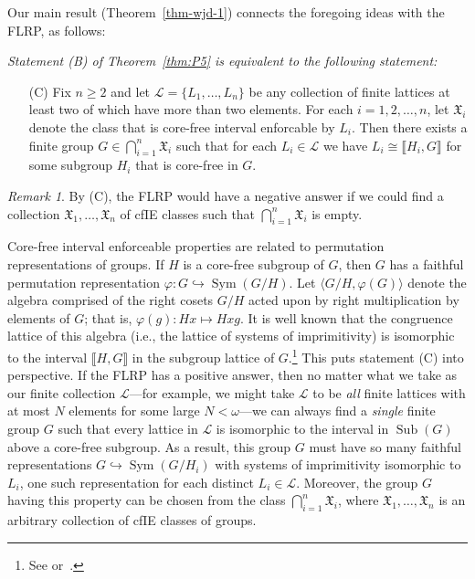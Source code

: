 \documentclass{gen-j-l}
\newcommand{\lb}{\ensuremath{\llbracket}}
\newcommand{\rb}{\ensuremath{\rrbracket}}
\newcommand{\<}{\ensuremath{\langle}}
\renewcommand{\>}{\ensuremath{\rangle}}
\theoremstyle{plain}
\theoremstyle{definition}
\theoremstyle{remark}
\newtheorem*{remark}{Remark}
\numberwithin{theorem}{section}
\numberwithin{claim}{section}
\numberwithin{equation}{section}
\numberwithin{conjecture}{section}
\renewcommand{\leq}{\ensuremath{\leqslant}}
\renewcommand{\geq}{\ensuremath{\geqslant}}
\newcommand{\Con}{\ensuremath{\operatorname{Con}}}
\newcommand{\Sub}{\ensuremath{\operatorname{Sub}}}
\newcommand{\Sym}{\ensuremath{\operatorname{Sym}}}
\newcommand{\2}{\ensuremath{\mathbf{2}}}
\newcommand{\3}{\ensuremath{\mathbf{3}}}
\newcommand{\sG}{\ensuremath{\mathfrak{X}}}
\newcommand{\sL}{\ensuremath{\mathscr{L}}}
\renewcommand{\phi}{\ensuremath{\varphi}}
\begin{document}
Our main result (Theorem~\ref{thm-wjd-1}) connects the
foregoing ideas with the \acs{FLRP}, as follows:\\[6pt]
{\it 
Statement (B) of Theorem~\ref{thm:P5} is equivalent to the following statement:

\begin{enumerate}
\item[(C)]
Fix $n\geq 2$ and let $\sL = \{L_1, \dots, L_n\}$ be any collection of
finite lattices at least two of which have more than two elements.
For each $i = 1, 2, \dots, n$, let $\sG_i$ denote the class that is
core-free interval enforcable by $L_i$. Then there exists a finite group $G \in
\bigcap\limits_{i=1}^n \sG_i$ such that for 
each $L_i \in \sL$ we have $L_i\cong \lb H_i, G \rb$ for some subgroup
$H_i$ that is core-free in $G$. %
\end{enumerate}

\begin{remark}
By (C), the \acs{FLRP} would have a negative answer if we
could find a collection $\sG_1, \dots, \sG_n$ of \acs{cfIE} classes
such that $\bigcap\limits_{i=1}^n \sG_i$ is empty.
\end{remark}
}

Core-free interval enforceable properties are related to
permutation representations of groups.
If $H$ is a core-free subgroup of $G$, then $G$ has a faithful permutation 
representation $\phi:G\hookrightarrow \Sym(G/H)$.
Let $\<G/H, \phi(G)\>$ denote the algebra comprised of the right cosets
$G/H$ acted upon by right multiplication by elements of $G$; that is,
$\phi(g): Hx \mapsto Hxg$.  It is
well known that the congruence lattice of this algebra (i.e., the lattice of
systems of imprimitivity) %
 is isomorphic to the interval $\lb H, G \rb$ in the subgroup
lattice of $G$.\footnote{See \cite[Lemma 4.20]{alvi:1987}
or~\cite[Theorem 1.5A]{Dixon:1996}.}
This puts statement (C) into perspective.
If the \acs{FLRP} has a positive answer, then no matter 
what we take as our finite collection $\sL$---for example, we
might take $\sL$ to be \emph{all} finite lattices with
at most $N$ elements for some large $N< \omega$---we can always find a \emph{single}
finite group $G$ such that every lattice in $\sL$ is isomorphic to the interval
in $\Sub(G)$ above a core-free subgroup.
As a result, this group $G$ must have so many faithful
representations  $G\hookrightarrow \Sym(G/H_i)$ with systems of imprimitivity
isomorphic to $L_i$,
one such
representation for each distinct $L_i\in \sL$.  Moreover, the group $G$ having
this property can be chosen from the class $\bigcap\limits_{i=1}^n \sG_i$, where 
$\sG_1, \dots, \sG_n$ is an arbitrary collection of \acs{cfIE} classes of groups.
\end{document}
